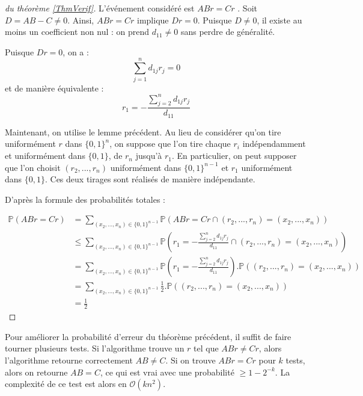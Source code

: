 \begin{proof}[du théorème \ref{ThmVerif}]
 L'événement considéré est \og $ABr=Cr$ \fg.  Soit $D=AB-C\neq 0$. Ainsi, $ABr=Cr$ implique $Dr=0$. Puisque $D\neq 0$, il existe au moins un coefficient non nul : on prend $d_{11}\neq 0$ sans perdre de généralité.
 
Puisque $Dr=0$, on a :
$$
\sum_{j=1}^n d_{1j}r_j=0
$$
et de manière équivalente  :
\begin{equation}
r_1 = - \frac{\sum_{j=2}^n d_{1j}r_j}{d_{11}}
\end{equation}

Maintenant, on utilise le lemme précédent. Au lieu de considérer qu'on tire uniformément $r$ dans $\{0,1\}^n$, on suppose que l'on tire chaque $r_i$ indépendamment et uniformément dans $\{0,1\}$, de $r_n$ jusqu'à $r_1$. En particulier, on peut supposer que l'on choisit $(r_2,...,r_n)$ uniformément dans $\{0,1\}^{n-1}$ et $r_1$ uniformément dans $\{0,1\}$. Ces deux tirages sont réalisés de manière indépendante.

D'après la formule des probabilités totales :

\begin{align*}
\mathbb{P}(ABr=Cr)
&= \sum_{(x_2,...,x_n) \in \{0,1\}^{n-1}} \mathbb{P}(ABr=Cr \cap (r_2,...,r_n) = (x_2,...,x_n)) \\
&\leq \sum_{(x_2,...,x_n) \in \{0,1\}^{n-1}} \mathbb{P}\left(r_1 = - \frac{\sum_{j=2}^n d_{1j}r_j}{d_{11}}
\cap (r_2,...,r_n) = (x_2,...,x_n)\right) \\
&= \sum_{(x_2,...,x_n) \in \{0,1\}^{n-1}} \mathbb{P}\left(r_1 = - \frac{\sum_{j=2}^n d_{1j}r_j}{d_{11}}\right) .
\mathbb{P}\left( (r_2,...,r_n) = (x_2,...,x_n)\right) \\
&= \sum_{(x_2,...,x_n) \in \{0,1\}^{n-1}} \frac{1}{2} .
\mathbb{P}\left( (r_2,...,r_n) = (x_2,...,x_n)\right) \\
&=\frac{1}{2}
\end{align*}
\end{proof}

Pour améliorer la probabilité d'erreur du théorème précédent, il suffit de faire tourner plusieurs tests. Si l'algorithme trouve un $r$ tel que $ABr\neq Cr$, alors l'algorithme retourne correctement $AB\neq C$. Si on trouve $ABr=Cr$ pour $k$ tests, alors on retourne $AB=C$, ce qui est vrai avec une probabilité $\geq 1-2^{-k}$. La complexité de ce test est alors en $\mathcal{O}(kn^2)$.